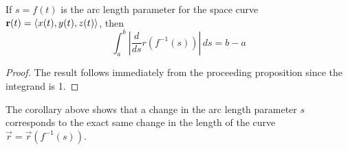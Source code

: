 \documentclass[handout]{ximera}
\begin{document}
\begin{corollary}
If $s = f(t)$ is the arc length parameter for the space curve $\mathbf r(t) = \left\langle x(t), y(t), z(t)\right\rangle$, then
\[
\int_a^b \left|\frac{d}{ds} r(f^{-1} (s))\right| \, ds = b-a
\]
\end{corollary}
\begin{proof}
The result follows immediately from the proceeding proposition since the integrand is 1.
\end{proof}




\begin{remark}
The corollary above shows that a change in the arc length parameter $s$ corresponds to the exact same change in the length of the curve $\vec r = \vec r(f^{-1}(s))$.
\end{remark}
\end{document}
